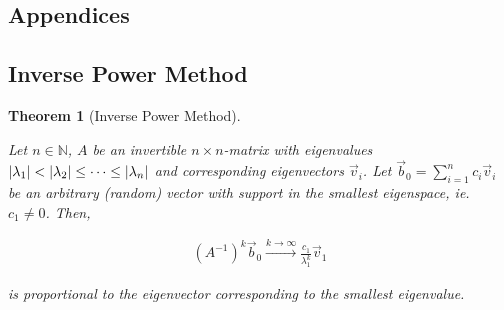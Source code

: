 \documentclass{article}
\theoremstyle{plain} %
\newtheorem{theorem}{Theorem}[section]
\theoremstyle{convention} %
\theoremstyle{remark} %
\numberwithin{equation}{section}
\begin{document}
\newpage




\newpage

\begin{appendix}

\section*{Appendices} %
\renewcommand{\thesubsection}{\Alph{subsection}} %

\renewcommand{\thetheorem}{\Alph{subsection}.\arabic{theorem}}
\renewcommand{\thedefinition}{\Alph{subsection}.\arabic{definition}}
\renewcommand{\thecorollary}{\Alph{subsection}.\arabic{corollary}}
\renewcommand{\theexample}{\Alph{subsection}.\arabic{example}}
\renewcommand{\theprop}{\Alph{subsection}.\arabic{prop}}
\renewcommand{\thelemma}{\Alph{subsection}.\arabic{lemma}}

\subsection{Inverse Power Method}

\label{sec:inverse_power_method}

\begin{theorem}[Inverse Power Method]

\label{thm:inverse_power_method}

Let $n \in \mathbb{N}$, $A$ be an invertible $n \times n$-matrix with eigenvalues $\abs{\lambda_1} < \abs{\lambda_2} \leq \dots \leq \abs{\lambda_n}$ and corresponding eigenvectors $\vec{v}_i$. Let $\vec{b}_0 = \sum_{i=1}^n c_i \vec{v}_i$ be an arbitrary (random) vector with support in the smallest eigenspace, ie. $c_1 \neq 0$. Then,

\begin{align*}
  (A^{-1})^k \vec{b}_0 \xrightarrow{k\rightarrow\infty} \frac{c_1}{\lambda_1^k} \vec{v}_1
\end{align*}

is proportional to the eigenvector corresponding to the smallest eigenvalue.

\end{theorem}


\end{appendix}
\end{document}
